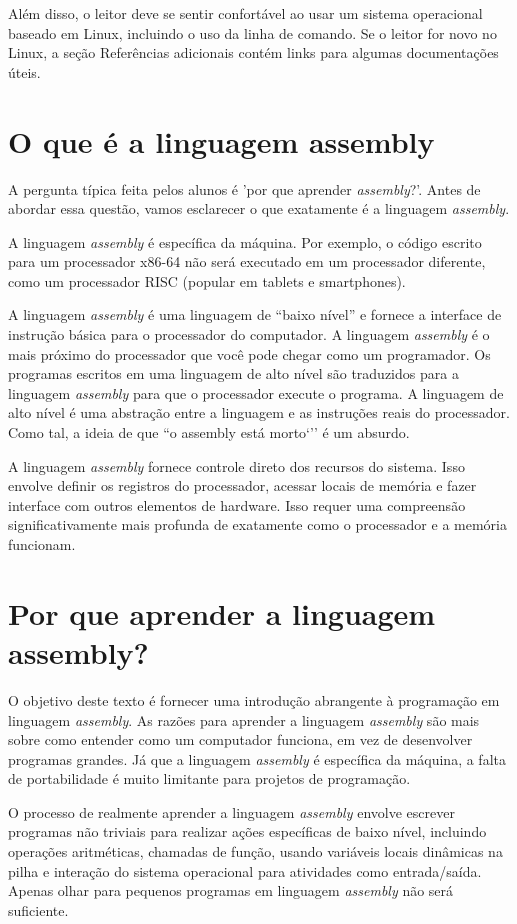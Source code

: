 Além disso, o leitor deve se sentir confortável ao usar um sistema operacional baseado em Linux, incluindo o uso da linha de comando. Se o leitor for novo no Linux, a seção Referências adicionais contém links para algumas documentações úteis.

\section{O que é a linguagem assembly}
A pergunta típica feita pelos alunos é 'por que aprender \textit{assembly}?'. Antes de abordar essa questão, vamos esclarecer o que exatamente é a linguagem \textit{assembly}.

A linguagem \textit{assembly} é específica da máquina. Por exemplo, o código escrito para um processador x86-64 não será executado em um processador diferente, como um processador RISC (popular em tablets e smartphones).

A linguagem \textit{assembly} é uma linguagem de ``baixo nível'' e fornece a interface de instrução básica para o processador do computador. A linguagem \textit{assembly} é o mais próximo do processador que você pode chegar como um programador. Os programas escritos em uma linguagem de alto nível são traduzidos para a linguagem \textit{assembly} para que o processador execute o programa. A linguagem de alto nível é uma abstração entre a linguagem e as instruções reais do processador. Como tal, a ideia de que ``o assembly está morto`'' é um absurdo.

A linguagem \textit{assembly} fornece controle direto dos recursos do sistema. Isso envolve definir os registros do processador, acessar locais de memória e fazer interface com outros elementos de hardware. Isso requer uma compreensão significativamente mais profunda de exatamente como o processador e a memória funcionam.

\section{Por que aprender a linguagem assembly?}
O objetivo deste texto é fornecer uma introdução abrangente à programação em linguagem \textit{assembly}. As razões para aprender a linguagem \textit{assembly} são mais sobre como entender como um computador funciona, em vez de desenvolver programas grandes. Já que a linguagem \textit{assembly} é específica da máquina, a falta de portabilidade é muito limitante para projetos de programação.

O processo de realmente aprender a linguagem \textit{assembly} envolve escrever programas não triviais para realizar ações específicas de baixo nível, incluindo operações aritméticas, chamadas de função, usando variáveis locais dinâmicas na pilha e interação do sistema operacional para atividades como entrada/saída. Apenas olhar para pequenos programas em linguagem \textit{assembly} não será suficiente.

